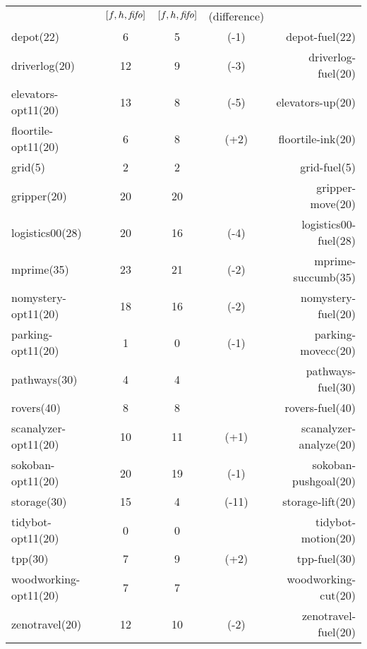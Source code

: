 \begin{center}
\begin{tabular}{|lc|ccr|}
 & \([f,h,{\text{\textit{fifo}}}]\) & \([f,h,{\text{\textit{fifo}}}]\) & (difference) & \\
depot(22) & 6 & 5 & (-1) & depot-fuel(22)\\
driverlog(20) & 12 & 9 & (-3) & driverlog-fuel(20)\\
elevators-opt11(20) & 13 & 8 & (-5) & elevators-up(20)\\
floortile-opt11(20) & 6 & 8 & (+2) & floortile-ink(20)\\
grid(5) & 2 & 2 &  & grid-fuel(5)\\
gripper(20) & 20 & 20 &  & gripper-move(20)\\
logistics00(28) & 20 & 16 & (-4) & logistics00-fuel(28)\\
mprime(35) & 23 & 21 & (-2) & mprime-succumb(35)\\
nomystery-opt11(20) & 18 & 16 & (-2) & nomystery-fuel(20)\\
parking-opt11(20) & 1 & 0 & (-1) & parking-movecc(20)\\
pathways(30) & 4 & 4 &  & pathways-fuel(30)\\
rovers(40) & 8 & 8 &  & rovers-fuel(40)\\
scanalyzer-opt11(20) & 10 & 11 & (+1) & scanalyzer-analyze(20)\\
sokoban-opt11(20) & 20 & 19 & (-1) & sokoban-pushgoal(20)\\
storage(30) & 15 & 4 & (-11) & storage-lift(20)\\
tidybot-opt11(20) & 0 & 0 &  & tidybot-motion(20)\\
tpp(30) & 7 & 9 & (+2) & tpp-fuel(30)\\
woodworking-opt11(20) & 7 & 7 &  & woodworking-cut(20)\\
zenotravel(20) & 12 & 10 & (-2) & zenotravel-fuel(20)\\
\end{tabular}
\end{center}
